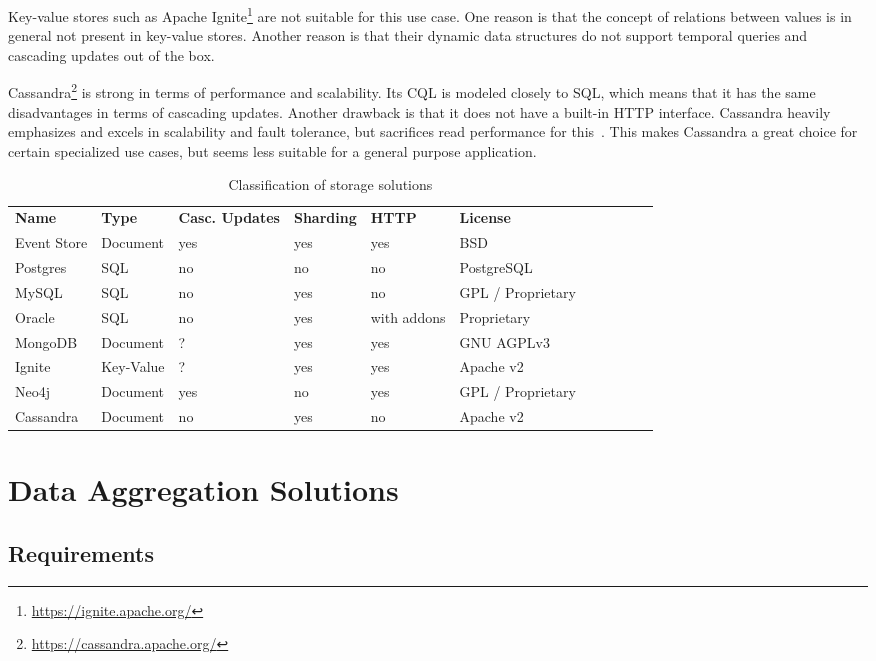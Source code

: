 Key-value stores such as Apache Ignite\footnote{\url{https://ignite.apache.org/}} are not suitable for this use case.
One reason is that the concept of relations between values is in general not present in key-value stores.
Another reason is that their dynamic data structures do not support temporal queries and cascading updates out of the box.

Cassandra\footnote{\url{https://cassandra.apache.org/}} is strong in terms of performance and scalability.
Its \ac{CQL} is modeled closely to \ac{SQL}, which means that it has the same disadvantages in terms of cascading updates.
Another drawback is that it does not have a built-in HTTP interface.
Cassandra heavily emphasizes and excels in scalability and fault tolerance, but sacrifices read performance for this~\cite{6625441}.
This makes Cassandra a great choice for certain specialized use cases, but seems less suitable for a general purpose application.

\begin{table}[]
\centering
\caption{Classification of storage solutions}
\begin{tabular}{lllllllllll}
\textbf{Name} & \textbf{Type} & \textbf{Casc. Updates} & \textbf{Sharding} & \textbf{HTTP} & \textbf{License} \\
Event Store & Document & yes & yes & yes & BSD \\
Postgres & SQL & no & no & no & PostgreSQL \\
MySQL & SQL & no & yes & no & GPL / Proprietary \\
Oracle & SQL & no & yes & with addons & Proprietary \\
MongoDB & Document & ? & yes & yes & GNU AGPLv3 \\
Ignite & Key-Value & ? & yes & yes & Apache v2 \\
Neo4j & Document & yes & no & yes & GPL / Proprietary \\
Cassandra & Document & no & yes & no & Apache v2
\end{tabular}
\label{table:classifications:storage}
\end{table}

\section{Data Aggregation Solutions}
\label{sec:classifications:aggregation}

\subsection{Requirements}


